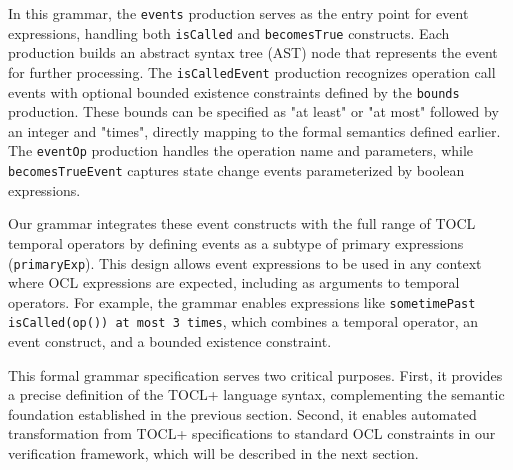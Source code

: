 In this grammar, the \texttt{events} production serves as the entry point for event 
expressions, handling both \texttt{isCalled} and \texttt{becomesTrue} constructs. 
Each production builds an abstract syntax tree (AST) node that represents the event 
for further processing. The \texttt{isCalledEvent} production recognizes operation 
call events with optional bounded existence constraints defined by the \texttt{bounds} 
production. These bounds can be specified as "at least" or "at most" followed by 
an integer and "times", directly mapping to the formal semantics defined earlier. 
The \texttt{eventOp} production handles the operation name and parameters, while 
\texttt{becomesTrueEvent} captures state change events parameterized by boolean 
expressions.

Our grammar integrates these event constructs with the full range of TOCL temporal 
operators by defining events as a subtype of primary expressions (\texttt{primaryExp}). 
This design allows event expressions to be used in any context where OCL expressions 
are expected, including as arguments to temporal operators. For example, the grammar 
enables expressions like \texttt{sometimePast isCalled(op()) at most 3 times}, which 
combines a temporal operator, an event construct, and a bounded existence constraint.

This formal grammar specification serves two critical purposes. First, it provides a 
precise definition of the TOCL+ language syntax, complementing the semantic 
foundation established in the previous section. Second, it enables automated 
transformation from TOCL+ specifications to standard OCL constraints in our 
verification framework, which will be described in the next section.